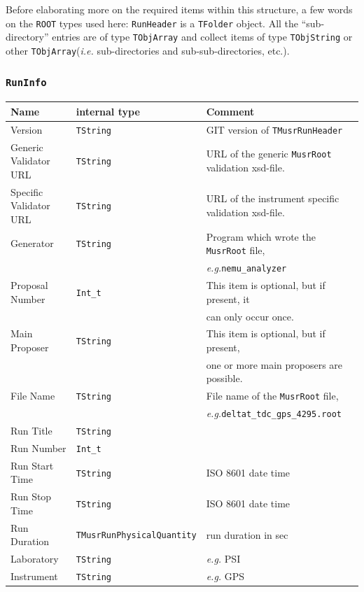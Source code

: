 \documentclass[twoside]{article}
\newcommand{\musrroot}{\texttt{MusrRoot}\xspace}
\newcommand{\rootcern}{\texttt{ROOT}\xspace}
\newcommand{\ie}{\emph{i.e.}\xspace}
\newcommand{\eg}{\emph{e.g.}\xspace}
\newcommand{\tmrh}{\texttt{TMusrRunHeader}\xspace}
\newcommand{\tfolder}{\texttt{TFolder}\xspace}
\newcommand{\tobjarray}{\texttt{TObjArray}\xspace}
\newcommand{\tobjstring}{\texttt{TObjString}\xspace}
\newcommand{\tstring}{\texttt{TString}\xspace}
\newcommand{\tquant}{\texttt{TMusrRunPhysicalQuantity}\xspace}
\begin{document}
Before elaborating more on the required items within this structure, a few words on the \rootcern types used here: \texttt{RunHeader} is a \tfolder object. All the ``sub-directory'' entries are of type \tobjarray and collect items of type \tobjstring or other \tobjarray (\ie sub-directories and sub-sub-directories, etc.).

\subsubsection{\texttt{RunInfo}}\label{sec:RunInfo}

\begin{small}
\begin{tabular}{l|l|l}
Name           & internal type & Comment \\ \hline\hline
Version        & \tstring      & GIT version of \tmrh \\
Generic Validator URL & \tstring & URL of the generic \musrroot validation xsd-file. \\
Specific Validator URL & \tstring & URL of the instrument specific validation xsd-file. \\
Generator      & \tstring      & Program which wrote the \musrroot file, \\
               &               & \eg \verb!nemu_analyzer! \\
Proposal Number & \verb!Int_t! & This item is optional, but if present, it \\
               &               & can only occur once. \\
Main Proposer  & \tstring      & This item is optional, but if present, \\
               &               & one or more main proposers are possible. \\
File Name      & \tstring      & File name of the \musrroot file, \\
               &               & \eg \verb!deltat_tdc_gps_4295.root! \\
Run Title      & \tstring      & \\
Run Number     & \verb!Int_t!  & \\
Run Start Time & \tstring      & ISO 8601 date time \\
Run Stop Time  & \tstring      & ISO 8601 date time \\
Run Duration   & \tquant       & run duration in sec \\
Laboratory     & \tstring      & \eg PSI \\
Instrument     & \tstring      & \eg GPS \\

\end{tabular}
\end{small}
\end{document}
